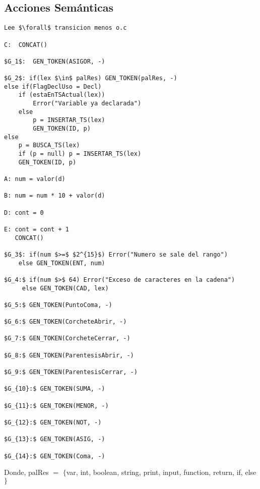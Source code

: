 \newpage
\subsection{Acciones Semánticas}

\begin{lstlisting}[style=AccionesSemanticas]
Lee $\forall$ transicion menos o.c

C:  CONCAT()

$G_1$:  GEN_TOKEN(ASIGOR, -)

$G_2$: if(lex $\in$ palRes) GEN_TOKEN(palRes, -)
else if(FlagDeclUso = Decl)
	if (estaEnTSActual(lex)) 
		Error("Variable ya declarada")
	else 
		p = INSERTAR_TS(lex)
		GEN_TOKEN(ID, p)
else 
	p = BUSCA_TS(lex)
	if (p = null) p = INSERTAR_TS(lex)
	GEN_TOKEN(ID, p)

A: num = valor(d)

B: num = num * 10 + valor(d)

D: cont = 0

E: cont = cont + 1
   CONCAT()

$G_3$: if(num $>=$ $2^{15}$) Error("Numero se sale del rango")
    else GEN_TOKEN(ENT, num)

$G_4:$ if(num $>$ 64) Error("Exceso de caracteres en la cadena")
     else GEN_TOKEN(CAD, lex)

$G_5:$ GEN_TOKEN(PuntoComa, -)

$G_6:$ GEN_TOKEN(CorcheteAbrir, -)

$G_7:$ GEN_TOKEN(CorcheteCerrar, -)

$G_8:$ GEN_TOKEN(ParentesisAbrir, -)

$G_9:$ GEN_TOKEN(ParentesisCerrar, -)

$G_{10}:$ GEN_TOKEN(SUMA, -)

$G_{11}:$ GEN_TOKEN(MENOR, -)

$G_{12}:$ GEN_TOKEN(NOT, -)

$G_{13}:$ GEN_TOKEN(ASIG, -)

$G_{14}:$ GEN_TOKEN(Coma, -)	
\end{lstlisting}
Donde, palRes $=$ $\{$var, int, boolean, string, print, input, function, return, if, else$\}$
\newline

